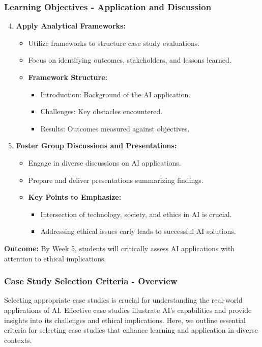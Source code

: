\documentclass{beamer}
\begin{document}
\begin{frame}[fragile]
    \frametitle{Learning Objectives - Application and Discussion}
    \begin{enumerate}
        \setcounter{enumi}{3} %
        \item \textbf{Apply Analytical Frameworks:}
        \begin{itemize}
            \item Utilize frameworks to structure case study evaluations.
            \item Focus on identifying outcomes, stakeholders, and lessons learned.
            \item \textbf{Framework Structure:}
            \begin{itemize}
                \item Introduction: Background of the AI application.
                \item Challenges: Key obstacles encountered.
                \item Results: Outcomes measured against objectives.
            \end{itemize}
        \end{itemize}

        \item \textbf{Foster Group Discussions and Presentations:}
        \begin{itemize}
            \item Engage in diverse discussions on AI applications.
            \item Prepare and deliver presentations summarizing findings.
            \item \textbf{Key Points to Emphasize:}
            \begin{itemize}
                \item Intersection of technology, society, and ethics in AI is crucial.
                \item Addressing ethical issues early leads to successful AI solutions.
            \end{itemize}
        \end{itemize}
    \end{enumerate}
    
    \textbf{Outcome:} By Week 5, students will critically assess AI applications with attention to ethical implications.
\end{frame}

\begin{frame}[fragile]
    \frametitle{Case Study Selection Criteria - Overview}
    Selecting appropriate case studies is crucial for understanding the real-world applications of AI. 
    Effective case studies illustrate AI's capabilities and provide insights into its challenges and ethical implications. 
    Here, we outline essential criteria for selecting case studies that enhance learning and application in diverse contexts.
\end{frame}
\end{document}
